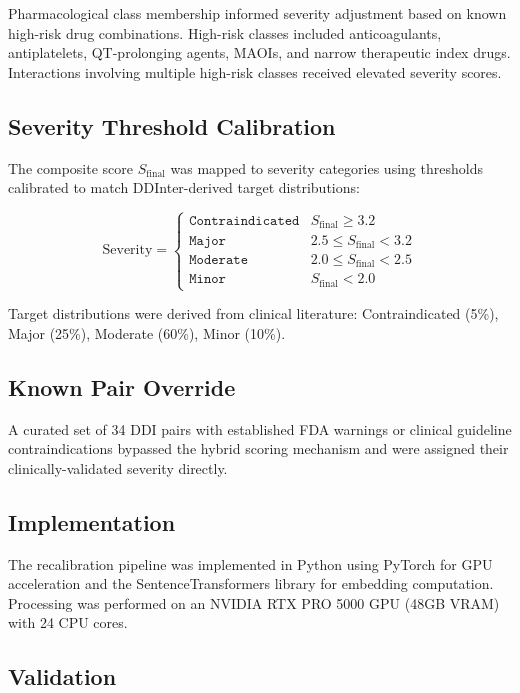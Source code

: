 \documentclass[11pt,a4paper]{article}
\begin{document}
Pharmacological class membership informed severity adjustment based on known high-risk drug combinations. High-risk classes included anticoagulants, antiplatelets, QT-prolonging agents, MAOIs, and narrow therapeutic index drugs. Interactions involving multiple high-risk classes received elevated severity scores.

\subsection*{Severity Threshold Calibration}

The composite score $S_{\text{final}}$ was mapped to severity categories using thresholds calibrated to match DDInter-derived target distributions:

\begin{equation}
\text{Severity} = 
\begin{cases}
\texttt{Contraindicated} & S_{\text{final}} \geq 3.2 \\
\texttt{Major} & 2.5 \leq S_{\text{final}} < 3.2 \\
\texttt{Moderate} & 2.0 \leq S_{\text{final}} < 2.5 \\
\texttt{Minor} & S_{\text{final}} < 2.0
\end{cases}
\end{equation}

Target distributions were derived from clinical literature: Contraindicated (5\%), Major (25\%), Moderate (60\%), Minor (10\%).

\subsection*{Known Pair Override}

A curated set of 34 DDI pairs with established FDA warnings or clinical guideline contraindications bypassed the hybrid scoring mechanism and were assigned their clinically-validated severity directly.

\subsection*{Implementation}

The recalibration pipeline was implemented in Python using PyTorch for GPU acceleration and the SentenceTransformers library for embedding computation. Processing was performed on an NVIDIA RTX PRO 5000 GPU (48GB VRAM) with 24 CPU cores.

\subsection*{Validation}
\end{document}
